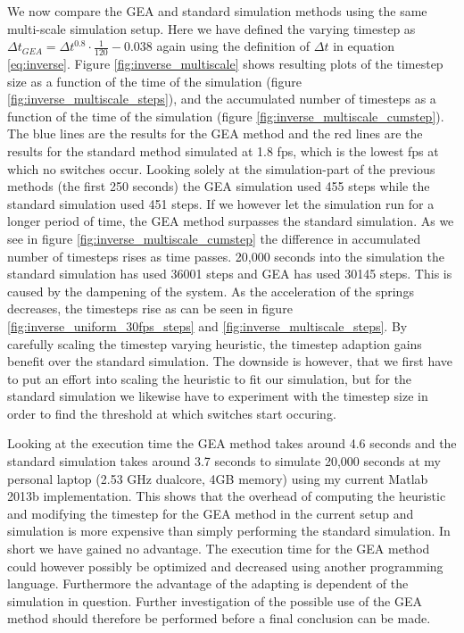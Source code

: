 \documentclass[11pt]{article}
\begin{document}
We now compare the GEA and standard simulation methods using the same
multi-scale simulation setup. Here we have defined the varying timestep
as $\Delta t_{GEA} = \Delta t^{0.8} \cdot \frac{1}{120}-0.038$ again
using the definition of $\Delta t$ in equation \ref{eq:inverse}.
Figure \ref{fig:inverse_multiscale} shows resulting plots of the
timestep size as a function of the time of the simulation (figure
\ref{fig:inverse_multiscale_steps}), and the accumulated number
of timesteps as a function of the time of the simulation (figure
\ref{fig:inverse_multiscale_cumstep}). The blue lines are the results for
the GEA method and the red lines are the results for the standard method
simulated at 1.8 fps, which is the lowest fps at which no switches occur.
Looking solely at the simulation-part of the previous methods (the first 250
seconds) the GEA simulation used 455 steps while the standard simulation
used 451 steps. If we however let the simulation run for a longer period
of time, the GEA method surpasses the standard simulation. As we see in
figure \ref{fig:inverse_multiscale_cumstep} the difference in accumulated
number of timesteps rises as time passes. 20,000 seconds into the
simulation the standard simulation has used 36001 steps and GEA has used
30145 steps. This is caused by the dampening of the system. As the acceleration
of the springs decreases, the timesteps rise as can be seen in figure
\ref{fig:inverse_uniform_30fps_steps} and \ref{fig:inverse_multiscale_steps}.
By carefully scaling the timestep varying heuristic, the timestep adaption
gains benefit over the standard simulation. The downside is however, that we
first have to put an effort into scaling the heuristic to fit our simulation,
but for the standard simulation we likewise have to experiment with the
timestep size in order to find the threshold at which switches start occuring.

Looking at the execution time the GEA method takes around 4.6 seconds and the
standard simulation takes around 3.7 seconds to simulate 20,000 seconds at my
personal laptop (2.53 GHz dualcore, 4GB memory) using my current Matlab 2013b
implementation. This shows that the overhead of computing the heuristic and
modifying the timestep for the GEA method in the current setup and simulation
is more expensive than simply performing the standard simulation. In short we
have gained no advantage. The execution time for the GEA method could however
possibly be optimized and decreased using another programming language.
Furthermore the advantage of the adapting is dependent of the simulation in
question. Further investigation of the possible use of the GEA method
should therefore be performed before a final conclusion can be made.
\end{document}
